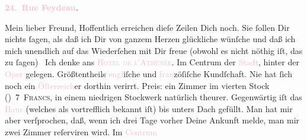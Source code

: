            \pstart
           \begin{otherlanguage}{french}\textcolor{gray}{\textbf{\textbf{\textcolor{pink}{24. Rue Feydeau}{}\ledrightnote{\textcolor{pink}{rue Feydeau}}.}}}\end{otherlanguage}\pend
           \pstart\center{}Mein lieber Freund,\pend\pstart
           Hoffentlich erreichen dieſe Zeilen Dich noch. Sie ſollen Dir nichts ſagen, als daß
               ich Dir von ganzem Herzen glückliche \label{K_L02807-1v}\label{K_L02807-1h} wünſche und daß ich mich unendlich auf das Wiederſehen mit Dir
               freue (obwohl es nicht nöthig iſt, das zu ſagen) {\dotsfour}\pend
           \pstart
           Ich denke ans \textsc{\textcolor{pink}{Hotel de l’Athénée}{}\ledrightnote{\textcolor{pink}{Hotel de l’Athénée}}}. Im Centrum der \textcolor{pink}{Stadt}{},
               hinter der \textcolor{pink}{Oper}{} gelegen.
               Größtentheils \textcolor{pink}{engl}{}iſche und \textcolor{pink}{fran}{}zöſiſche Kundſchaft. Nie hat
               ſich noch ein {\pb}\textcolor{pink}{Öſterreich}{}\ledrightnote{\textcolor{pink}{Österreich}}er dorthin verirrt. Preis: ein Zimmer
               im vierten Stock (\label{K_L02807-3v}\label{K_L02807-3h}) 7 \textsc{Francs}, in einem niedrigen Stockwerk natürlich theurer.
               Gegenwärtig iſt das \textcolor{pink}{Haus}{}
               (welches als vortrefflich bekannt iſt) bis unters Dach gefüllt. Man hat mir aber
               verſprochen, daß, wenn ich drei Tage vorher Deine Ankunft melde, man mir zwei Zimmer
               reſerviren wird. Im \textcolor{pink}{Centrum}{}
